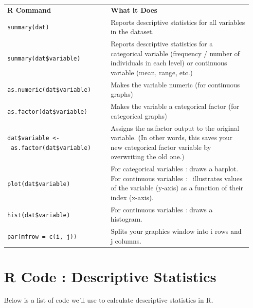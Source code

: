 \documentclass[
  letterpaper,
  DIV=11,
  numbers=noendperiod,
  oneside]{scrreprt}
\begin{document}
\begin{longtable}[]{@{}
  >{\raggedright\arraybackslash}p{}
  >{\raggedright\arraybackslash}p{}@{}}
\toprule\noalign{}
\endhead
\bottomrule\noalign{}
\endlastfoot
\textbf{R Command} & \textbf{What it Does} \\
\texttt{summary(dat)} & Reports descriptive statistics for all variables
in the dataset. \\
\texttt{summary(dat\$variable)} & Reports descriptive statistics for a
categorical variable (frequency / number of individuals in each level)
or continuous variable (mean, range, etc.) \\
\texttt{as.numeric(dat\$variable)} & Makes the variable numeric (for
continuous graphs) \\
\texttt{as.factor(dat\$variable)} & Makes the variable a categorical
factor (for categorical graphs) \\
\texttt{dat\$variable\ \textless{}-\ as.factor(dat\$variable)} & Assigns
the as.factor output to the original variable. (In other words, this
saves your new categorical factor variable by overwriting the old
one.) \\
\texttt{plot(dat\$variable)} & For categorical variables : draws a
barplot. For continuous variables :~ illustrates values of the variable
(y-axis) as a function of their index (x-axis). \\
\texttt{hist(dat\$variable)} & For continuous variables : draws a
histogram. \\
\texttt{par(mfrow\ =\ c(i,\ j))} & Splits your graphics window into i
rows and j columns. \\
\end{longtable}

\section{R Code : Descriptive
Statistics}\label{r-code-descriptive-statistics-1}

Below is a list of code we'll use to calculate descriptive statistics in
R.
\end{document}
